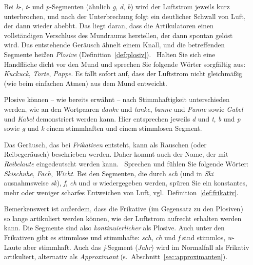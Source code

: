 Bei \textit{k}-, \textit{t}- und \textit{p}-Segmenten (ähnlich \textit{g}, \textit{d}, \textit{b}) wird der Luftstrom jeweils kurz unterbrochen, und nach der Unterbrechung folgt ein deutlicher Schwall von Luft, der dann wieder abebbt.
Das liegt daran, dass die Artikulatoren einen vollständigen Verschluss des Mundraums herstellen, der dann spontan gelöst wird.
Das entstehende Geräusch ähnelt einem Knall, und die betreffenden Segmente heißen \textit{Plosive} (Definition~\ref{def:plosiv}).
\TuBegin~Halten Sie sich eine Handfläche dicht vor den Mund und sprechen Sie folgende Wörter sorgfältig aus: \textit{Kuckuck}, \textit{Torte}, \textit{Pappe}.
Es fällt sofort auf, dass der Luftstrom nicht gleichmäßig (wie beim einfachen Atmen) aus dem Mund entweicht.


Plosive können -- wie bereits erwähnt -- nach Stimmhaftigkeit unterschieden werden, wie an den Wortpaaren \textit{danke} und \textit{tanke}, \textit{banne} und \textit{Panne} sowie \textit{Gabel} und \textit{Kabel} demonstriert werden kann.
Hier entsprechen jeweils \textit{d} und \textit{t}, \textit{b} und \textit{p} sowie \textit{g} und \textit{k} einem stimmhaften und einem stimmlosen Segment.

Das Geräusch, das bei \textit{Frikativen} entsteht, kann als Rauschen (oder Reibegeräusch) beschrieben werden.
Daher kommt auch der Name, der mit \textit{Reibelaute} eingedeutscht werden kann.
\TuBegin~Sprechen und fühlen Sie folgende Wörter: \textit{Skischuhe}, \textit{Fach}, \textit{Wicht}.
Bei den Segmenten, die durch \textit{sch} (und in \textit{Ski} ausnahmsweise \textit{sk}), \textit{f}, \textit{ch} und \textit{w} wiedergegeben werden, spüren Sie ein konstantes, mehr oder weniger scharfes Entweichen von Luft, vgl.\ Definition~\ref{def:frikativ}.


Bemerkenswert ist außerdem, dass die Frikative (im Gegensatz zu den Plosiven) so lange artikuliert werden können, wie der Luftstrom aufrecht erhalten werden kann.
Die Segmente sind also \textit{kontinuierlicher} als Plosive.
Auch unter den Frikativen gibt es stimmlose und stimmhafte: \textit{sch}, \textit{ch} und \textit{f} sind stimmlos, \textit{w}-Laute aber \zB stimmhaft.
Auch das \textit{j}-Segment (\textit{Jahr}) wird im Normalfall als Frikativ artikuliert, alternativ als \textit{Approximant} (s.\ Abschnitt~\ref{sec:approximanten}).

